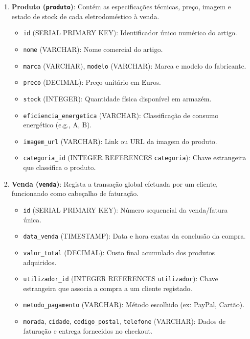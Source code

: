 \documentclass[11pt,a4paper,oneside]{report}
\begin{document}
\begin{enumerate}
    \item \textbf{Produto (\texttt{produto})}: Contém as especificações técnicas, preço, imagem e estado de stock de cada eletrodoméstico à venda.
    \begin{itemize}
        \item \texttt{id} (SERIAL PRIMARY KEY): Identificador único numérico do artigo.
        \item \texttt{nome} (VARCHAR): Nome comercial do artigo.
        \item \texttt{marca} (VARCHAR), \texttt{modelo} (VARCHAR): Marca e modelo do fabricante.
        \item \texttt{preco} (DECIMAL): Preço unitário em Euros.
        \item \texttt{stock} (INTEGER): Quantidade física disponível em armazém.
        \item \texttt{eficiencia\_energetica} (VARCHAR): Classificação de consumo energético (e.g., A, B).
        \item \texttt{imagem\_url} (VARCHAR): Link ou URL da imagem do produto.
        \item \texttt{categoria\_id} (INTEGER REFERENCES \texttt{categoria}): Chave estrangeira que classifica o produto.
    \end{itemize}

    \item \textbf{Venda (\texttt{venda})}: Regista a transação global efetuada por um cliente, funcionando como cabeçalho de faturação.
    \begin{itemize}
        \item \texttt{id} (SERIAL PRIMARY KEY): Número sequencial da venda/fatura única.
        \item \texttt{data\_venda} (TIMESTAMP): Data e hora exatas da conclusão da compra.
        \item \texttt{valor\_total} (DECIMAL): Custo final acumulado dos produtos adquiridos.
        \item \texttt{utilizador\_id} (INTEGER REFERENCES \texttt{utilizador}): Chave estrangeira que associa a compra a um cliente registado.
        \item \texttt{metodo\_pagamento} (VARCHAR): Método escolhido (ex: PayPal, Cartão).
        \item \texttt{morada}, \texttt{cidade}, \texttt{codigo\_postal}, \texttt{telefone} (VARCHAR): Dados de faturação e entrega fornecidos no checkout.
    \end{itemize}


\end{enumerate}
\end{document}
